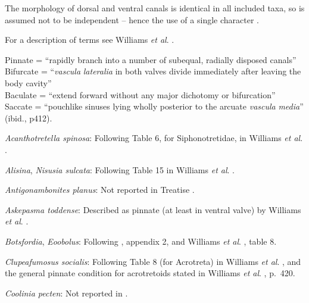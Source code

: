\documentclass[openany]{book}
\theoremstyle{definition}
\theoremstyle{definition}
\theoremstyle{definition}
\theoremstyle{remark}
\begin{document}
The morphology of dorsal and ventral canals is identical in all included
taxa, so is assumed not to be independent -- hence the use of a single
character \citep[contra][]{Williams2000LinguliformeaCraniiformea}.

For a description of terms see Williams \emph{et al}.
\citeyearpar[2000]{Williams1997Introduction}.

Pinnate = ``rapidly branch into a number of subequal, radially disposed
canals''\\
Bifurcate = ``\emph{vascula} \emph{lateralia} in both valves divide
immediately after leaving the body cavity''\\
Baculate = ``extend forward without any major dichotomy or bifurcation''
\citep[ p.~418]{Williams1997Introduction}\\
Saccate = ``pouchlike sinuses lying wholly posterior to the arcuate
\emph{vascula} \emph{media}'' (ibid., p412).

\hypertarget{Acanthotretella_spinosa-coding-34}{}
\emph{Acanthotretella spinosa}: Following Table 6, for Siphonotretidae,
in Williams \emph{et al}.
\citeyearpar{Williams2000LinguliformeaCraniiformea}.

\hypertarget{Alisina-coding-34}{}
\emph{Alisina}, \emph{Nisusia sulcata}: Following Table 15 in Williams
\emph{et al}. \citeyearpar{Williams2000LinguliformeaCraniiformea}.

\hypertarget{Antigonambonites_planus-coding-34}{}
\emph{Antigonambonites planus}: Not reported in Treatise
\citep{Williams2000LinguliformeaCraniiformea}.

\hypertarget{Askepasma_toddense-coding-34}{}
\emph{Askepasma toddense}: Described as pinnate (at least in ventral
valve) by Williams \emph{et al}.
\citeyearpar[p.~250]{Williams1998Thediversity}.

\hypertarget{Botsfordia-coding-34}{}
\emph{Botsfordia}, \emph{Eoobolus}: Following
\citet{Williams1998Thediversity}, appendix 2, and Williams \emph{et al}.
\citeyearpar{Williams2000LinguliformeaCraniiformea}, table 8.

\hypertarget{Clupeafumosus_socialis-coding-34}{}
\emph{Clupeafumosus socialis}: Following Table 8 (for Acrotreta) in
Williams \emph{et al}.
\citeyearpar{Williams2000LinguliformeaCraniiformea}, and the general
pinnate condition for acrotretoids stated in Williams \emph{et al}.
\citeyearpar{Williams1997Introduction}, p.~420.

\hypertarget{Coolinia_pecten-coding-34}{}
\emph{Coolinia pecten}: Not reported in
\citet{Williams2000LinguliformeaCraniiformea}.
\end{document}
